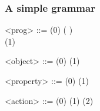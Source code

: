 \documentclass{beamer}
\begin{document}
\begin{frame}
\frametitle{A simple grammar}
\begin{grammar}
<prog>     ::=   \hfill (0) \hspace{1em}
            \alt {} \lit*(  \lit*)
              \\\lit*{\{}  \lit*{\}} \hfill (1) \hspace{1em}

<object>   ::=  \hfill (0) \hspace{1em}
            \alt {} \hfill (1) \hspace{1em}

<property> ::=  \hfill (0) \hspace{1em}
            \alt {} \hfill (1) \hspace{1em}

<action>   ::=  \hfill (0) \hspace{1em}
            \alt {} \hfill (1) \hspace{1em}
            \alt {} \hfill (2) \hspace{1em} \par
\end{grammar}
\end{frame}
\end{document}
